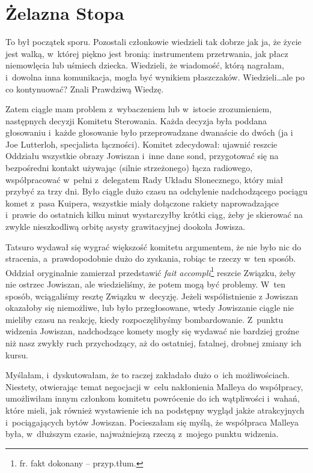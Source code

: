 \documentclass[oneside,polish,11pt,sfheadings]{mwbk}
\begin{document}
\chapter{Żelazna Stopa}

To był początek sporu. Pozostali członkowie wiedzieli tak dobrze jak ja,
że życie jest walką, w~której piękno jest bronią: instrumentem
przetrwania, jak płacz niemowlęcia lub uśmiech dziecka. Wiedzieli, że
wiadomość, którą nagrałam, i~dowolna inna komunikacja, mogła być
wynikiem płaszczaków. Wiedzieli\ldots  ale po co kontynuować? Znali
Prawdziwą Wiedzę.

Zatem ciągle mam problem z~wybaczeniem lub w~istocie zrozumieniem,
następnych decyzji Komitetu Sterowania. Każda decyzja była poddana
głosowaniu i~każde głosowanie było przeprowadzane dwanaście do dwóch (ja
i Joe Lutterloh, specjalista łączności). Komitet zdecydował: ujawnić
reszcie Oddziału wszystkie obrazy Jowiszan i~inne dane sond, przygotować
się na bezpośredni kontakt używając (silnie strzeżonego) łącza
radiowego, współpracować w~pełni z~delegatem Rady Układu Słonecznego,
który miał przybyć za trzy dni. Było ciągle dużo czasu na odchylenie
nadchodzącego pociągu komet z~pasa Kuipera, wszystkie miały dołączone
rakiety naprowadzające i~prawie do ostatnich kilku minut wystarczyłby
krótki ciąg, żeby je skierować na zwykle nieszkodliwą orbitę asysty
grawitacyjnej dookoła Jowisza.

Tatsuro wydawał się wygrać większość komitetu argumentem, że nie było
nic do stracenia, a~prawdopodobnie dużo do zyskania, robiąc te rzeczy w~ten sposób. Oddział oryginalnie zamierzał przedstawić \textit{fait
accompli}\footnote{ fr. fakt dokonany -- przyp.tłum.} reszcie Związku, żeby
nie ostrzec Jowiszan, ale wiedzieliśmy, że potem mogą być problemy. W~ten sposób, wciągaliśmy resztę Związku w~decyzję. Jeżeli współistnienie
z Jowiszan okazałoby się niemożliwe, lub było przegłosowane, wtedy
Jowiszanie ciągle nie mieliby czasu na reakcję, kiedy rozpoczęlibyśmy
bombardowanie. Z~punktu widzenia Jowiszan, nadchodzące komety mogły się
wydawać nie bardziej groźne niż nasz zwykły ruch przychodzący, aż do
ostatniej, fatalnej, drobnej zmiany ich kursu.

Myślałam, i~dyskutowałam, że to raczej zakładało dużo o~ich
możliwościach. Niestety, otwierając temat negocjacji w~celu nakłonienia
Malleya do współpracy, umożliwiłam innym członkom komitetu powrócenie do
ich wątpliwości i~wahań, które mieli, jak również wystawienie ich na
podstępny wygląd jakże atrakcyjnych i~pociągających bytów Jowiszan.
Pocieszałam się myślą, że współpraca Malleya była, w~dłuższym czasie,
najważniejszą rzeczą z~mojego punktu widzenia.
\end{document}
